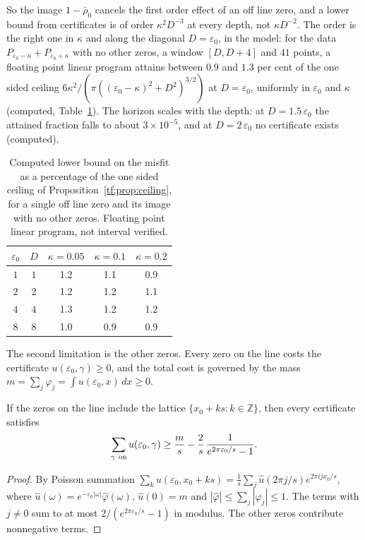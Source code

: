 So the image $1-\bar\rho_0$ cancels the first order effect of an off line zero, and a lower bound from certificates is of order $\kappa^2D^{-3}$ at every depth, not $\kappa D^{-2}$. The order is the right one in $\kappa$ and along the diagonal $D=\varepsilon_0$, in the model: for the data $P_{\varepsilon_0-\kappa}+P_{\varepsilon_0+\kappa}$ with no other zeros, a window $[D,D+4]$ and $41$ points, a floating point linear program attains between $0.9$ and $1.3$ per cent of the one sided ceiling $6\kappa^2/(\pi((\varepsilon_0-\kappa)^2+D^2)^{3/2})$ at $D=\varepsilon_0$, uniformly in $\varepsilon_0$ and $\kappa$ (computed, Table~\ref{tf:tab:ceiling}). The horizon scales with the depth: at $D=1.5\,\varepsilon_0$ the attained fraction falls to about $3\times10^{-5}$, and at $D=2\,\varepsilon_0$ no certificate exists (computed).

\begin{table}[htbp]
\centering\footnotesize
\begin{tabular}{@{}cc|ccc@{}}
\toprule
$\varepsilon_0$ & $D$ & $\kappa=0.05$ & $\kappa=0.1$ & $\kappa=0.2$\\
\midrule
$1$ & $1$ & 1.2 & 1.1 & 0.9\\
$2$ & $2$ & 1.2 & 1.2 & 1.1\\
$4$ & $4$ & 1.3 & 1.2 & 1.2\\
$8$ & $8$ & 1.0 & 0.9 & 0.9\\
\bottomrule
\end{tabular}
\caption{Computed lower bound on the misfit as a percentage of the one sided ceiling of Proposition~\ref{tf:prop:ceiling}, for a single off line zero and its image with no other zeros. Floating point linear program, not interval verified.}
\label{tf:tab:ceiling}
\end{table}

The second limitation is the other zeros. Every zero on the line costs the certificate $u(\varepsilon_0,\gamma)\ge0$, and the total cost is governed by the mass $m=\sum_j\varphi_j=\int u(\varepsilon_0,x)\,dx\ge0$.

\begin{lemma}[Clutter]\label{tf:lem:clutter}
If the zeros on the line include the lattice $\{x_0+ks:k\in\mathbb Z\}$, then every certificate satisfies
\[
\sum_{\gamma\ {\rm on}}u(\varepsilon_0,\gamma)\ge\frac ms-\frac2s\,\frac1{e^{2\pi\varepsilon_0/s}-1}.
\]
\end{lemma}

\begin{proof}
By Poisson summation $\sum_ku(\varepsilon_0,x_0+ks)=\frac1s\sum_j\hat u(2\pi j/s)e^{2\pi ijx_0/s}$, where $\hat u(\omega)=e^{-\varepsilon_0|\omega|}\hat\varphi(\omega)$, $\hat u(0)=m$ and $|\hat\varphi|\le\sum_j|\varphi_j|\le1$. The terms with $j\ne0$ sum to at most $2/(e^{2\pi\varepsilon_0/s}-1)$ in modulus. The other zeros contribute nonnegative terms.
\end{proof}


